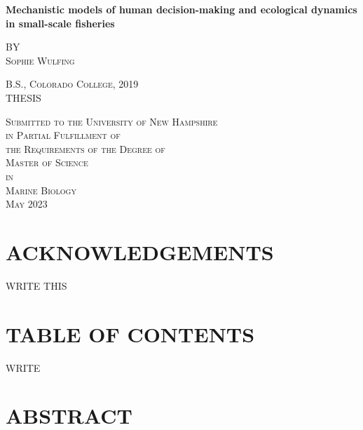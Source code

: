\documentclass[
]{article}
\author{}
\date{\vspace{-2.5em}}
\begin{document}

\begin{center}
    
\textbf{\Large Mechanistic models of human decision-making and ecological dynamics in small-scale fisheries}
    
\textsc{BY \\ Sophie Wulfing}
\vspace{3 mm}

\textsc{B.S., Colorado College, 2019 \\ }
\vspace{3 mm}
\textsc{THESIS}

\vspace{3 mm}
\textsc{Submitted to the University of New Hampshire \\ in Partial Fulfillment of \\ the Requirements of the Degree of \\ Master of Science \\ in \\ Marine Biology \\ May 2023}

\end{center}

\newpage


\hypertarget{acknowledgements}{%
\section{ACKNOWLEDGEMENTS}\label{acknowledgements}}

WRITE THIS

\newpage

\hypertarget{table-of-contents}{%
\section{TABLE OF CONTENTS}\label{table-of-contents}}

WRITE

\newpage

\hypertarget{abstract}{%
\section{ABSTRACT}\label{abstract}}
\end{document}
